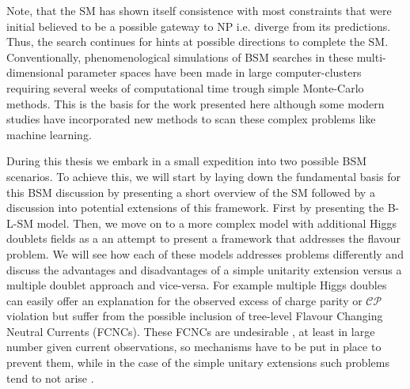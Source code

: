 
Note, that the SM has shown itself consistence with most constraints that were initial believed to be a possible gateway to NP i.e. diverge from its predictions. Thus, the search continues for hints at possible directions to complete the SM. %
%
Conventionally, phenomenological simulations of BSM searches in these multi-dimensional parameter spaces have been made in large computer-clusters requiring several weeks of computational time trough simple Monte-Carlo methods. 
%
This is the basis for the work presented here although some modern studies have incorporated new methods to scan these complex problems like machine learning. 
%


During this thesis we embark in a small expedition into two possible BSM scenarios.
%
To achieve this, we will start by laying down the fundamental basis for this BSM discussion by presenting a short overview of the SM followed by a discussion into potential extensions of this framework. First by presenting the B-L-SM model. 
%
Then, we move on to a more complex model with additional Higgs doublets fields as
a an attempt to present a framework that addresses the flavour problem.
%
We will see how each of these models addresses problems differently and discuss the advantages and disadvantages of a simple unitarity extension versus a multiple doublet approach and vice-versa. 
%
For example multiple Higgs doubles can easily offer an explanation for the observed excess of charge parity or $\mathcal{CP}$ violation but suffer from the possible inclusion of tree-level Flavour Changing Neutral Currents (FCNCs). These FCNCs are undesirable \cite{ILYUSHIN2020114921}, at least in large number given current observations, so mechanisms have to be put in place to prevent them, while in the case of the simple unitary extensions such problems tend to not arise \cite{Huitu2019}. 


